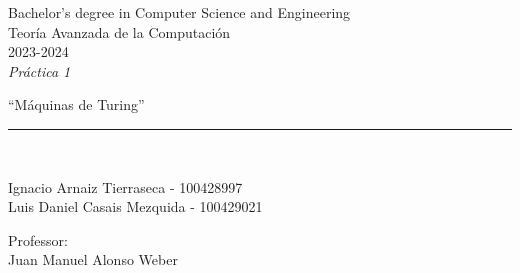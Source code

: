 \def\degree{Bachelor's degree in Computer Science and Engineering}
\def\subject{Teoría Avanzada de la Computación}
\def\year{2023-2024}
\def\labType{Práctica 1}
\def\labName{Máquinas de Turing}
\def\proffesor{Juan Manuel Alonso Weber}

\begin{titlepage}
	\begin{sffamily}
	\color{azulUC3M}
	\begin{center}

		\begin{figure}[H]
		\end{figure}
		\vspace{1.5cm}

		\begin{Large}
			\degree\\
            \subject\\
			\year\\
			\vspace{2cm}		
			\textsl{\labType}
			\bigskip
			
		\end{Large}

		{\Huge ``\labName''}\\

		\vspace*{0.5cm}
		\rule{10.5cm}{0.1mm}\\
		\vspace*{0.9cm}
		
 		{\LARGE Ignacio Arnaiz Tierraseca - 100428997}\\
 		\vspace*{0.2cm}
 		{\LARGE Luis Daniel Casais Mezquida - 100429021}\\
 		\vspace*{0.2cm}
		
		\vspace*{0.8cm}
		
		\begin{Large}
		    Professor:\\
			\proffesor\\
		\end{Large}

	\end{center}
	\vfill
	\end{sffamily}
\end{titlepage}